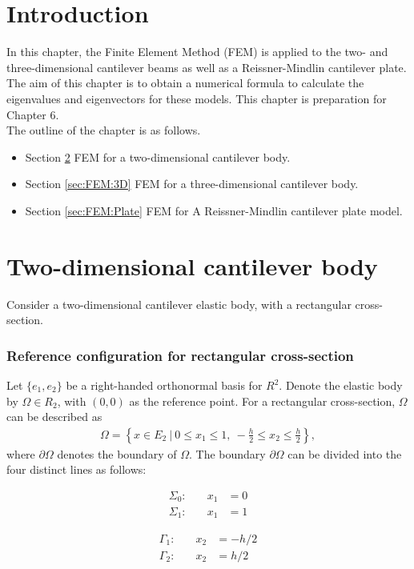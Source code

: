 \documentclass[../../main.tex]{subfiles}
\begin{document}
\section{Introduction}
In this chapter, the Finite Element Method (FEM) is applied to the two- and three-dimensional cantilever beams as well as a Reissner-Mindlin cantilever plate. The aim of this chapter is to obtain a numerical formula to calculate the eigenvalues and eigenvectors for these models. This chapter is preparation for Chapter 6.\\

The outline of the chapter is as follows.
\begin{itemize}
	\item[] Section \ref{sec:FEM:2D} FEM for a two-dimensional cantilever body.
	\item[] Section \ref{sec:FEM:3D} FEM for a three-dimensional cantilever body. 
	\item[] Section \ref{sec:FEM:Plate} FEM for A Reissner-Mindlin cantilever plate model. 
\end{itemize}

\section{Two-dimensional cantilever body} \label{sec:FEM:2D}
Consider a two-dimensional cantilever elastic body, with a rectangular cross-section.

\subsubsection{Reference configuration for rectangular cross-section}
Let $\{e_1,e_2\}$ be a right-handed orthonormal basis for $R^2$. Denote the elastic body by $\Omega \in R_2$, with $(0,0)$ as the reference point. For a rectangular cross-section, $\Omega$ can be described as
\begin{eqnarray*}
	\Omega = \left \{ x \in E_2 \ | \ 0 \leq x_1 \leq 1, \ -\frac{h}{2} \leq x_2 \leq \frac{h}{2} \right \},
\end{eqnarray*} where $\partial \Omega$ denotes the boundary of $\Omega$. The boundary $\partial \Omega$ can be divided into the four distinct lines as follows:

\noindent\begin{minipage}{.5\linewidth}
	\begin{eqnarray*}
		\Sigma_0:& \quad x_1 &= 0\\
		\Sigma_1:& \quad x_1 &= 1
	\end{eqnarray*}
\end{minipage}%
\begin{minipage}{.5\linewidth}
	\begin{eqnarray*}
		\Gamma_1:& \quad x_2 &= -{h}/{2}\\
		\Gamma_2:& \quad x_2 &= {h}/{2}
	\end{eqnarray*}
\end{minipage}
\end{document}
